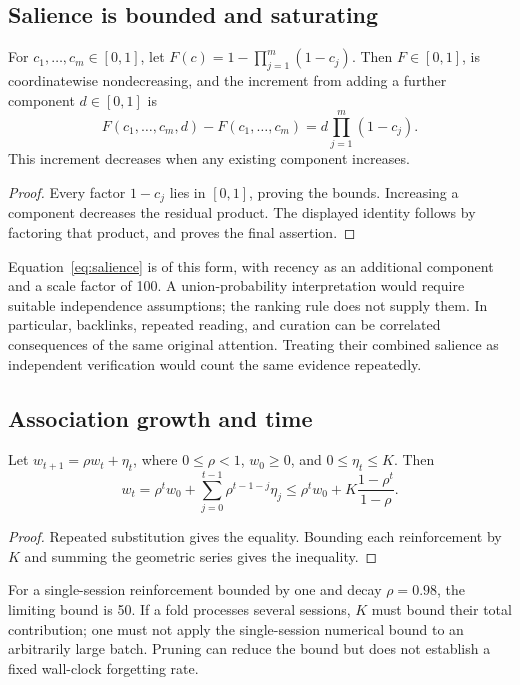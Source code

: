\subsection{Salience is bounded and saturating}

\begin{proposition}
For $c_1,\ldots,c_m\in[0,1]$, let
$F(c)=1-\prod_{j=1}^m(1-c_j)$. Then $F\in[0,1]$, is coordinatewise nondecreasing, and the increment from adding a further component $d\in[0,1]$ is
\[
F(c_1,\ldots,c_m,d)-F(c_1,\ldots,c_m)
=d\prod_{j=1}^m(1-c_j).
\]
This increment decreases when any existing component increases.
\end{proposition}
\begin{proof}
Every factor $1-c_j$ lies in $[0,1]$, proving the bounds. Increasing a component decreases the residual product. The displayed identity follows by factoring that product, and proves the final assertion.
\end{proof}

Equation~\eqref{eq:salience} is of this form, with recency as an additional component and a scale factor of 100. A union-probability interpretation would require suitable independence assumptions; the ranking rule does not supply them. In particular, backlinks, repeated reading, and curation can be correlated consequences of the same original attention. Treating their combined salience as independent verification would count the same evidence repeatedly.

\subsection{Association growth and time}

\begin{proposition}
Let $w_{t+1}=\rho w_t+\eta_t$, where $0\leq\rho<1$, $w_0\geq0$, and $0\leq\eta_t\leq K$. Then
\[
w_t=\rho^tw_0+\sum_{j=0}^{t-1}\rho^{t-1-j}\eta_j
\leq \rho^tw_0+K\frac{1-\rho^t}{1-\rho}.
\]
\end{proposition}
\begin{proof}
Repeated substitution gives the equality. Bounding each reinforcement by $K$ and summing the geometric series gives the inequality.
\end{proof}

For a single-session reinforcement bounded by one and decay $\rho=0.98$, the limiting bound is 50. If a fold processes several sessions, $K$ must bound their total contribution; one must not apply the single-session numerical bound to an arbitrarily large batch. Pruning can reduce the bound but does not establish a fixed wall-clock forgetting rate.

